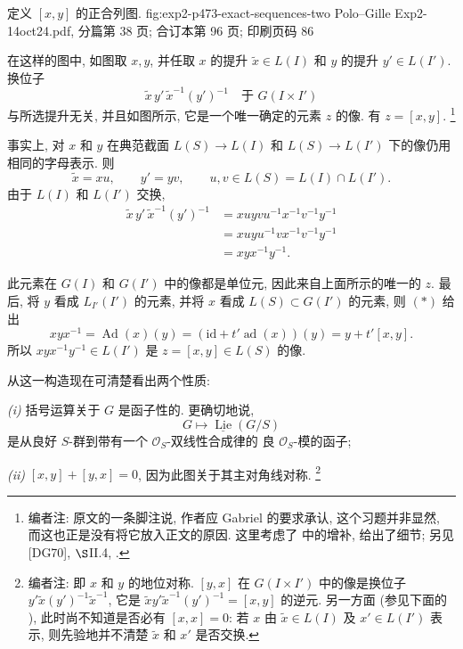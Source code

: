   {定义 \([x,y]\) 的正合列图.}
  {fig:exp2-p473-exact-sequences-two}
  {Polo--Gille Exp2-14oct24.pdf, 分篇第 38 页; 合订本第 96 页; 印刷页码 86}

在这样的图中, 如图取 \(x,y\), 并任取
\(x\) 的提升 \(\widetilde x\in L(I)\) 和 \(y\) 的提升 \(y'\in L(I')\).
换位子
\[
 \widetilde x\,y'\,\widetilde x^{-1}(y')^{-1}
 \quad\text{于 }G(I\times I')
\]
与所选提升无关, 并且如图所示, 它是一个唯一确定的元素 \(z\) 的像.
有 \(z=[x,y]\).
\footnote{编者注: 原文的一条脚注说, 作者应 Gabriel 的要求承认,
这个习题并非显然, 而这也正是没有将它放入正文的原因.
这里考虑了  中的增补,
给出了细节; 另见 [DG70], \(\S\)II.4, .}

事实上, 对 \(x\) 和 \(y\) 在典范截面
\(L(S)\to L(I)\) 和 \(L(S)\to L(I')\) 下的像仍用相同的字母表示.
则
\[
 \widetilde x=xu,\qquad y'=yv,
 \qquad u,v\in L(S)=L(I)\cap L(I').
\]
由于 \(L(I)\) 和 \(L(I')\) 交换,
\[
\begin{aligned}
 \widetilde x\,y'\,\widetilde x^{-1}(y')^{-1}
 &=xuyvu^{-1}x^{-1}v^{-1}y^{-1}\\
 &=xuyu^{-1}vx^{-1}v^{-1}y^{-1}\\
 &=xyx^{-1}y^{-1}.
\end{aligned}
\]

此元素在 \(G(I)\) 和 \(G(I')\) 中的像都是单位元,
因此来自上面所示的唯一的 \(z\). 最后, 将 \(y\) 看成
\(L_{I'}(I')\) 的元素, 并将 \(x\) 看成
\(L(S)\subset G(I')\) 的元素, 则 
\((*)\) 给出
\[
 xyx^{-1}
 =\operatorname{Ad}(x)(y)
 =(\mathrm{id}+t'\operatorname{ad}(x))(y)
 =y+t'[x,y].
\]
所以 \(xyx^{-1}y^{-1}\in L(I')\) 是
\(z=[x,y]\in L(S)\) 的像.

从这一构造现在可清楚看出两个性质:

\textit{(i)}
括号运算关于 \(G\) 是函子性的. 更确切地说,
\[
 G\longmapsto\underline{\operatorname{Lie}}(G/S)
\]
是从良好 \(S\)-群到带有一个 \(\mathcal O_S\)-双线性合成律的
良 \(\mathcal O_S\)-模的函子;

\textit{(ii)} \([x,y]+[y,x]=0\), 因为此图关于其主对角线对称.
\footnote{编者注: 即 \(x\) 和 \(y\) 的地位对称.
\([y,x]\) 在 \(G(I\times I')\) 中的像是换位子
\(y'\widetilde x(y')^{-1}\widetilde x^{-1}\), 它是
\(\widetilde x y'\widetilde x^{-1}(y')^{-1}=[x,y]\) 的逆元.
另一方面 (参见下面的 ),
此时尚不知道是否必有 \([x,x]=0\): 若 \(x\) 由
\(\widetilde x\in L(I)\) 及 \(x'\in L(I')\) 表示,
则先验地并不清楚 \(\widetilde x\) 和 \(x'\) 是否交换.}

